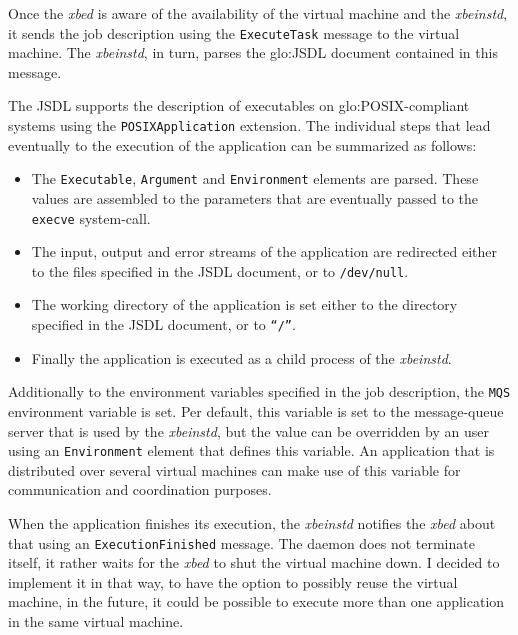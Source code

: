 Once the \emph{xbed}  is aware of the availability  of the virtual machine
and  the   \emph{xbeinstd},  it  sends  the  job   description  using  the
\texttt{ExecuteTask} message to  the virtual machine. The \emph{xbeinstd},
in turn, parses the \gls{glo:JSDL} document contained in this message.

The    JSDL     supports    the    description     of    executables    on
\gls{glo:POSIX}-compliant  systems  using the  \texttt{POSIX\-Application}
extension. The individual  steps that lead eventually to  the execution of
the application can be summarized as follows:

\begin{itemize}
\item The  \texttt{Executable}, \texttt{Argument} and \texttt{Environment}
  elements are parsed.  These values are assembled to  the parameters that
  are eventually passed to the \texttt{execve} system-call.
\item  The  input,  output  and  error  streams  of  the  application  are
  redirected  either to the  files specified  in the  JSDL document,  or to
  \texttt{/dev/null}.
\item  The working  directory  of the  application  is set  either to  the
  directory specified in the JSDL document, or to \texttt{``/''}.
\item  Finally the  application  is executed  as  a child  process of  the
  \emph{xbeinstd}.
\end{itemize}

Additionally   to  the   environment  variables   specified  in   the  job
description, the  \texttt{MQS} environment variable is  set.  Per default,
this  variable is  set to  the message-queue  server that  is used  by the
\emph{xbeinstd},  but the  value can  be overridden  by an  user  using an
\texttt{Environment} element  that defines this  variable.  An application
that is  distributed over  several virtual machines  can make use  of this
variable for communication and coordination purposes.

When the application finishes  its execution, the \emph{xbeinstd} notifies
the   \emph{xbed}   about   that   using   an   \texttt{ExecutionFinished}
message. The  daemon does  not terminate itself,  it rather waits  for the
\emph{xbed} to shut the virtual machine down. I decided to implement it in
that way, to have the option to possibly reuse the virtual machine, \ie in
the future, it  could be possible to execute more  than one application in
the same virtual machine.

